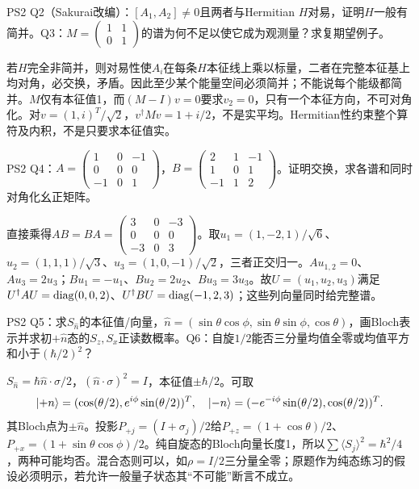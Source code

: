 \begin{exercise}
PS2 Q2（Sakurai改编）：$[A_1,A_2]\ne0$且两者与Hermitian $H$对易，证明$H$一般有简并。Q3：$M=\begin{pmatrix}1&1\\0&1\end{pmatrix}$的谱为何不足以使它成为观测量？求复期望例子。
\end{exercise}
\begin{solution}
若$H$完全非简并，则对易性使$A_i$在每条$H$本征线上乘以标量，二者在完整本征基上均对角，必交换，矛盾。因此至少某个能量空间必须简并；不能说每个能级都简并。$M$仅有本征值1，而$(M-I)v=0$要求$v_2=0$，只有一个本征方向，不可对角化。对$v=(1,i)^T/\sqrt2$，$v^\dagger Mv=1+i/2$，不是实平均。Hermitian性约束整个算符及内积，不是只要求本征值实。
\end{solution}
\begin{exercise}
PS2 Q4：$A=\begin{pmatrix}1&0&-1\\0&0&0\\-1&0&1\end{pmatrix}$，$B=\begin{pmatrix}2&1&-1\\1&0&1\\-1&1&2\end{pmatrix}$。证明交换，求各谱和同时对角化幺正矩阵。
\end{exercise}
\begin{solution}
直接乘得$AB=BA=\begin{pmatrix}3&0&-3\\0&0&0\\-3&0&3\end{pmatrix}$。取$u_1=(1,-2,1)/\sqrt6$、$u_2=(1,1,1)/\sqrt3$、$u_3=(1,0,-1)/\sqrt2$，三者正交归一。$Au_{1,2}=0$、$Au_3=2u_3$；$Bu_1=-u_1$、$Bu_2=2u_2$、$Bu_3=3u_3$。故$U=(u_1,u_2,u_3)$满足$U^\dagger AU=\operatorname{diag}(0,0,2)$、$U^\dagger BU=\operatorname{diag}(-1,2,3)$；这些列向量同时给完整谱。
\end{solution}
\begin{exercise}
PS2 Q5：求$S_{\hat n}$的本征值/向量，$\hat n=(\sin\theta\cos\phi,\sin\theta\sin\phi,\cos\theta)$，画Bloch表示并求初$+\hat n$态的$S_z,S_x$正读数概率。Q6：自旋$1/2$能否三分量均值全零或均值平方和小于$(\hbar/2)^2$？
\end{exercise}
\begin{solution}
$S_{\hat n}=\hbar\hat n\cdot\sigma/2$，$(\hat n\cdot\sigma)^2=I$，本征值$\pm\hbar/2$。可取
\[\lvert +n\rangle=(\cos(\theta/2),e^{i\phi}\sin(\theta/2))^T,\quad\lvert -n\rangle=(-e^{-i\phi}\sin(\theta/2),\cos(\theta/2))^T.\]
其Bloch点为$\pm\hat n$。投影$P_{+j}=(I+\sigma_j)/2$给$P_{+z}=(1+\cos\theta)/2$、$P_{+x}=(1+\sin\theta\cos\phi)/2$。纯自旋态的Bloch向量长度1，所以$\sum\langle S_j\rangle^2=\hbar^2/4$，两种可能均否。混合态则可以，如$\rho=I/2$三分量全零；原题作为纯态练习的假设必须明示，若允许一般量子状态其“不可能”断言不成立。
\end{solution}


